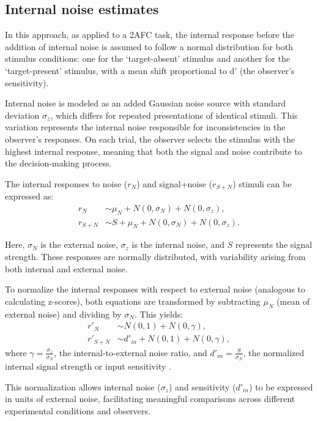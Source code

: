 \subsection {Internal noise estimates} 
In this approach, as applied to a 2AFC task, the internal response before the addition of internal noise is assumed to follow a normal distribution for both stimulus conditions: one for the ‘target-absent’ stimulus and another for the ‘target-present’ stimulus, with a mean shift proportional to d' (the observer's sensitivity).

Internal noise is modeled as an added Gaussian noise source with standard deviation $\sigma_z$, which differs for repeated presentations of identical stimuli. This variation represents the internal noise responsible for inconsistencies in the observer's responses. On each trial, the observer selects the stimulus with the highest internal response, meaning that both the signal and noise contribute to the decision-making process.

The internal responses to noise ($r_N$) and signal+noise ($r_{S+N}$) stimuli can be expressed as:
\begin{align}
r_N &\sim \mu_N + N(0, \sigma_N) + N(0, \sigma_z), \\
r_{S+N} &\sim S + \mu_N + N(0, \sigma_N) + N(0, \sigma_z).
\end{align}

Here, $\sigma_N$ is the external noise, $\sigma_z$ is the internal noise, and $S$ represents the signal strength. These responses are normally distributed, with variability arising from both internal and external noise.

To normalize the internal responses with respect to external noise (analogous to calculating z-scores), both equations are transformed by subtracting $\mu_N$ (mean of external noise) and dividing by $\sigma_N$. This yields:
\begin{align}
r'_N &\sim N(0, 1) + N(0, \gamma), \\
r'_{S+N} &\sim d'_{in} + N(0, 1) + N(0, \gamma),
\end{align}
where $\gamma = \frac{\sigma_z}{\sigma_N}$, the internal-to-external noise ratio, and $d'_{in} = \frac{S}{\sigma_N}$, the normalized internal signal strength or input sensitivity \cite{diependaele_how_2012}.

This normalization allows internal noise ($\sigma_z$) and sensitivity ($d'_{in}$) to be expressed in units of external noise, facilitating meaningful comparisons across different experimental conditions and observers.


